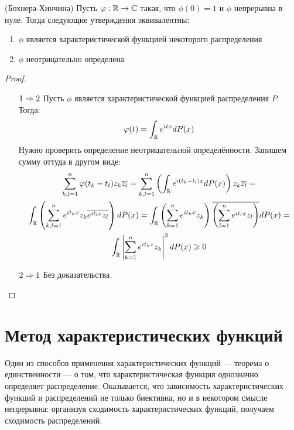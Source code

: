 \begin{theorem} (Бохнера-Хинчина)
    Пусть $\varphi: \mathbb{R} \to \mathbb{C}$ такая, что $\phi(0)=1$ и $\phi$ непрерывна в нуле. Тогда следующие утверждения эквивалентны:
    \begin{enumerate}
        \item $\phi$ является характеристической функцией некоторого распределения
        \item $\phi$ неотрицательно определена
    \end{enumerate}
\end{theorem}

\begin{proof}~
    \begin{itemize}
        \item[$1 \Rightarrow 2$] Пусть $\phi$ является характеристической функцией распределения $P$. Тогда:
        \[
            \varphi(t) = \int_{\mathbb{R}} e^{itx} dP(x)
        \]
        Нужно проверить определение неотрицательной определённости. Запишем сумму оттуда в другом виде:
        \begin{multline*}
            \sum_{k, l = 1}^n \varphi(t_k - t_l) z_k \overline{z_l} = \sum_{k, l = 1}^n \left(\int_{\mathbb{R}} e^{i(t_k - t_l)x} dP(x)\right) z_k \overline{z_l} =
            \\
            \int_{\mathbb{R}} \left(\sum_{k, l = 1}^n e^{it_kx} z_k \overline{e^{it_lx} z_l}\right) dP(x) =
            \int_{\mathbb{R}} \left(\sum_{k=1}^n e^{it_kx}z_k\right) \overline{ \left(\sum_{l=1}^n e^{it_lx}z_l\right)} dP(x) =
            \\
            \int_{\mathbb{R}} \left|\sum_{k=1}^n e^{it_kx}z_k\right|^2 dP(x) \geqslant 0
        \end{multline*}
        
        \item[$2 \Rightarrow 1$] Без доказательства.
    \end{itemize}
\end{proof}

\section{Метод характеристических функций}

\begin{note}
    Один из способов применения характеристических функций --- теорема о единственности --- о том, что характеристическая функция однозначно определяет распределение. Оказывается, что зависимость характеристических функций и распределений не только биективна, но и в некотором смысле непрерывна: организуя сходимость характеристических функций, получаем сходимость распределений.
\end{note}

